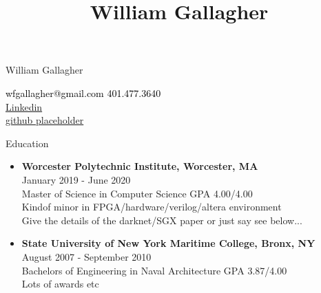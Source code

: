 \documentclass[10pt,a4paper]{article}
\title{William Gallagher}
\begin{document}
{\selectfont

\begin{tcolorbox}
  \begin{minipage}{.5\textwidth}
    \huge{William Gallagher}
  \end{minipage}
  \begin{minipage}{.5\textwidth}
      \begin{center}
        \begin{flushright}
          {\textcolor{black}
            {
              {\selectfont
                wfgallagher@gmail.com  401.477.3640\\
                \href{https://www.linkedin.com/in/william-gallagher-705199170}{Linkedin} \\
                \href{https://www.github.com}{github placeholder} \\
              }
            }
          }
        \end{flushright}
      \end{center}
  \end{minipage}
\end{tcolorbox}

\begin{tcolorbox}

  {\selectfont
    \begin{center}
      \LARGE{Education}
    \end{center}
  }

  \tcblower

  \begin{itemize}
  \item
    {
      \large{\textbf{Worcester Polytechnic Institute, Worcester, MA}} \\
      January 2019 - June 2020 \\
      Master of Science in Computer Science GPA 4.00/4.00 \\
      Kindof minor in FPGA/hardware/verilog/altera environment \\
      Give the details of the darknet/SGX paper or just say see below...
    }
  \item
    {
      \large{\textbf{State University of New York Maritime College, Bronx, NY}} \\
      August 2007 - September 2010 \\
      Bachelors of Engineering in Naval Architecture GPA 3.87/4.00 \\
      Lots of awards etc
    }
  \end{itemize}
\end{tcolorbox}

}
\end{document}
